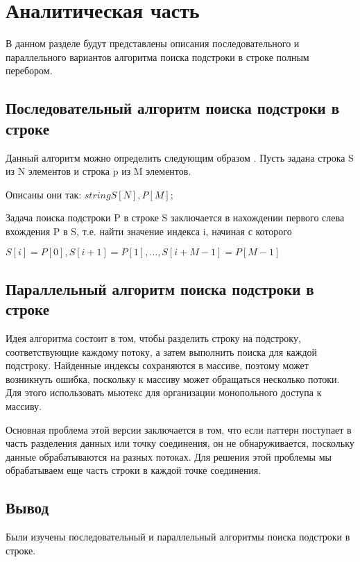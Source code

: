 \chapter{Аналитическая часть}

В данном разделе будут представлены описания последовательного и параллельного вариантов алгоритма поиска подстроки в строке полным перебором.

\section{Последовательный алгоритм поиска подстроки в строке}
Данный алгоритм можно определить следующим образом \cite{alg}. 
Пусть задана строка S из N элементов и строка p из M элементов. 

Описаны они так: $string S[N], P[M];$


Задача поиска подстроки P в строке S заключается в нахождении первого слева вхождения P в S, т.е. найти значение индекса i, начиная с которого 

$S[i] = P[0], S[i + 1] = P[1],…, S[i + M - 1] = P[M - 1]$

\section{Параллельный алгоритм поиска подстроки в строке}
Идея алгоритма состоит в том, чтобы разделить строку на подстроку, соответствующие каждому потоку, а затем выполнить поиска для каждой подстроку.
Найденные индексы сохраняются в массиве, поэтому может возникнуть ошибка, поскольку к массиву может обращаться несколько потоки. 
Для этого использовать мьютекс  для организации монопольного доступа к массиву.

Основная проблема этой версии заключается в том, что если паттерн поступает в часть разделения данных или точку соединения, он не обнаруживается, поскольку данные обрабатываются на разных потоках.
Для решения этой проблемы мы обрабатываем еще часть строки в каждой точке соединения.

\section*{Вывод}

Были изучены последовательный и параллельный алгоритмы поиска подстроки в строке.